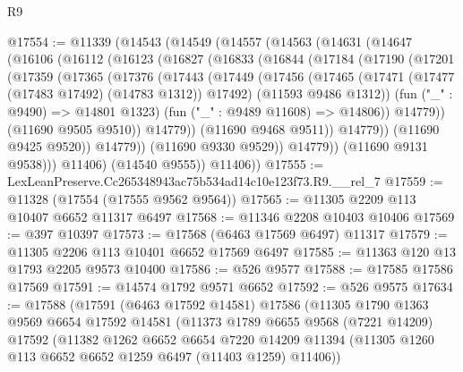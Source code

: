 \begin{lexlean}{R9}
\begin{coremodule}
@17554 := @11339
    (@14543
      (@14549
        (@14557
          (@14563
            (@14631
              (@14647
                (@16106
                  (@16112
                    (@16123
                      (@16827
                        (@16833
                          (@16844
                            (@17184
                              (@17190
                                (@17201
                                  (@17359
                                    (@17365
                                      (@17376
                                        (@17443
                                          (@17449
                                            (@17456
                                              (@17465
                                                (@17471
                                                  (@17477 (@17483 @17492) (@14783 @1312))
                                                  @17492)
                                                (@11593 @9486 @1312))
                                              (fun ("_" : @9490) => @14801 @1323)
                                              (fun ("_" : @9489 @11608) => @14806))
                                            @14779))
                                        (@11690 @9505 @9510))
                                      @14779))
                                  (@11690 @9468 @9511))
                                @14779))
                            (@11690 @9425 @9520))
                          @14779))
                      (@11690 @9330 @9529))
                    @14779))
                (@11690 @9131 @9538)))
            @11406)
          (@14540 @9555))
        @11406))
@17555 := LexLeanPreserve.Cc265348943ac75b534ad14c10e123f73.R9.__rel_7
@17559 := @11328 (@17554 (@17555 @9562 @9564))
@17565 := @11305 @2209 @113 @10407 @6652 @11317 @6497
@17568 := @11346 @2208 @10403 @10406
@17569 := @397 @10397
@17573 := @17568 (@6463 @17569 @6497) @11317
@17579 := @11305 @2206 @113 @10401 @6652 @17569 @6497
@17585 := @11363 @120 @13 @1793 @2205 @9573 @10400
@17586 := @526 @9577
@17588 := @17585 @17586 @17569
@17591 := @14574 @1792 @9571 @6652
@17592 := @526 @9575
@17634 := @17588
    (@17591
      (@6463 @17592 @14581)
      @17586
      (@11305
        @1790
        @1363
        @9569
        @6654
        @17592
        @14581
        (@11373
          @1789
          @6655
          @9568
          (@7221 @14209)
          @17592
          (@11382
            @1262
            @6652
            @6654
            @7220
            @14209
            @11394
            (@11305 @1260 @113 @6652 @6652 @1259 @6497 (@11403 @1259) @11406))

\end{coremodule}
\end{lexlean}
